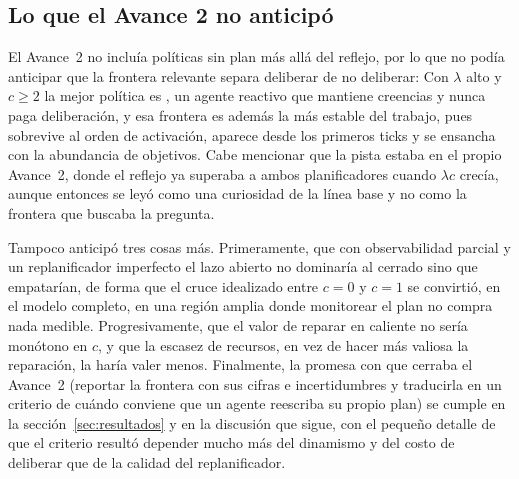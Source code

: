 \subsection{Lo que el Avance 2 no anticipó}

El Avance~2 no incluía políticas sin plan más allá del reflejo, por lo que no podía anticipar que la frontera relevante separa deliberar de no deliberar: Con $\lambda$ alto y $c\ge2$ la mejor política es \MB, un agente reactivo que mantiene creencias y nunca paga deliberación, y esa frontera es además la más estable del trabajo, pues sobrevive al orden de activación, aparece desde los primeros ticks y se ensancha con la abundancia de objetivos. Cabe mencionar que la pista estaba en el propio Avance~2, donde el reflejo ya superaba a ambos planificadores cuando $\lambda c$ crecía, aunque entonces se leyó como una curiosidad de la línea base y no como la frontera que buscaba la pregunta.

Tampoco anticipó tres cosas más. Primeramente, que con observabilidad parcial y un replanificador imperfecto el lazo abierto no dominaría al cerrado sino que empatarían, de forma que el cruce idealizado entre $c=0$ y $c=1$ se convirtió, en el modelo completo, en una región amplia donde monitorear el plan no compra nada medible. Progresivamente, que el valor de reparar en caliente no sería monótono en $c$, y que la escasez de recursos, en vez de hacer más valiosa la reparación, la haría valer menos. Finalmente, la promesa con que cerraba el Avance~2 (reportar la frontera con sus cifras e incertidumbres y traducirla en un criterio de cuándo conviene que un agente reescriba su propio plan) se cumple en la sección~\ref{sec:resultados} y en la discusión que sigue, con el pequeño detalle de que el criterio resultó depender mucho más del dinamismo y del costo de deliberar que de la calidad del replanificador.
